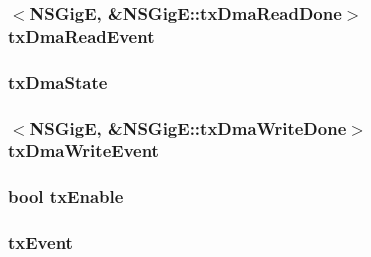 \label{classNSGigE_a5782be4cae30f9377ab0c645a9f65892}
\hypertarget{classNSGigE_a807712f075f68d20468d8bfd5c2683eb}{
\subsubsection[{txDmaReadEvent}]{$<${\bf NSGigE}, \&NSGigE::txDmaReadDone$>$ {\bf txDmaReadEvent}}}
\label{classNSGigE_a807712f075f68d20468d8bfd5c2683eb}
\hypertarget{classNSGigE_a1cda128022a8e667c16defad72fc3897}{
\subsubsection[{txDmaState}]{ {\bf txDmaState}}}
\label{classNSGigE_a1cda128022a8e667c16defad72fc3897}
\hypertarget{classNSGigE_a4b6694e9bda6524d3be9c4a0455e9092}{
\subsubsection[{txDmaWriteEvent}]{$<${\bf NSGigE}, \&NSGigE::txDmaWriteDone$>$ {\bf txDmaWriteEvent}}}
\label{classNSGigE_a4b6694e9bda6524d3be9c4a0455e9092}
\hypertarget{classNSGigE_a950ab5d638f497b596eacdbf60bcb3f0}{
\subsubsection[{txEnable}]{\setlength{\rightskip}{0pt plus 5cm}bool {\bf txEnable}}}
\label{classNSGigE_a950ab5d638f497b596eacdbf60bcb3f0}
\hypertarget{classNSGigE_a324fed072a29716c20a98a82927bd2a2}{
\subsubsection[{txEvent}]{ {\bf txEvent}}}

